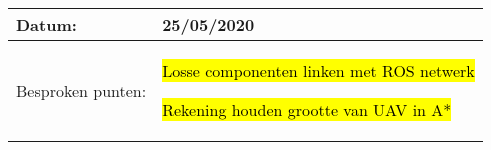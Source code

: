 \begin{tabularx}{\textwidth}{| l | X |}
  \hline
  Datum: & 25/05/2020\\
  \hline
  Besproken punten: &
  \begin{compactitem}
    \item \hl{Losse componenten linken met ROS netwerk}
    \item \hl{Rekening houden grootte van UAV in A*}
  \end{compactitem}\\
  \hline
\end{tabularx}